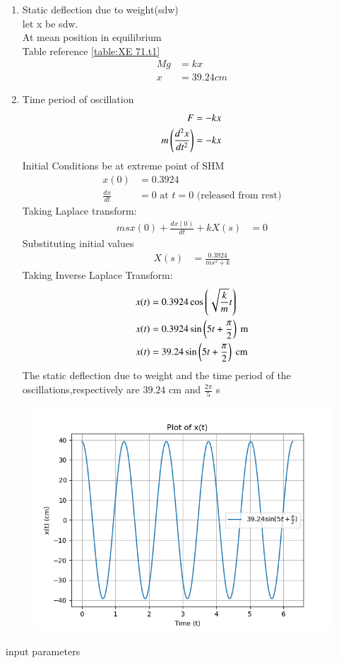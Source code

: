 \documentclass[journal,12pt,twocolumn]{IEEEtran}
\theoremstyle{remark}
\begin{document}
\begin{enumerate}
    \item Static deflection due to weight(sdw)\\
    let x be sdw.\\
    At mean position in equilibrium\\
     Table reference \ref{table:XE 71.t1}
    \begin{align}
        Mg&=kx\\
        x&=39.24cm
    \end{align}
     \item Time period of oscillation\\
          \begin{align}
           F&=-kx\\
           m\left(\frac{d^2x}{dt^2}\right)&=-kx
     \end{align}
      Initial Conditions be at extreme  point of SHM
      \begin{align}
       x(0)&=0.3924\\
       \frac{dx}{dt}&=0 \text{ at } t=0 \text{ (released from rest)} 
        \end{align} 
     Taking Laplace transform:
     \begin{align}
      msx(0) + \frac{dx(0)}{dt} + kX(s) &= 0
      \end{align}
      Substituting initial values
      \begin{align}
      X(s) &= \frac{0.3924}{ms^2 + k}
     \end{align}
     Taking Inverse Laplace Transform:\\
     \begin{align}
      x(t) &= 0.3924 \cos\left(\sqrt{\frac{k}{m}}t\right)\\
      x(t)&=0.3924\sin\left(5t+\frac{\pi}{2}\right)\text{ m}\\
      x(t)&=39.24 \sin\left(5t+\frac{\pi}{2}\right) \text{ cm}
     \end{align}
    The static deflection due to weight and the time period of the oscillations,respectively are $39.24$ cm and $\frac{2\pi}{5}$ s
\end{enumerate}
 \begin{figure}[h!]
    \centering
    \includegraphics[width = \columnwidth]{figs/xe_71_f2.png}
\end{figure}
 \begin{table}[!ht]
    \centering
        
    \caption{input parameters}
     \label{XE 71.t1}
\end{table}
\end{document}
